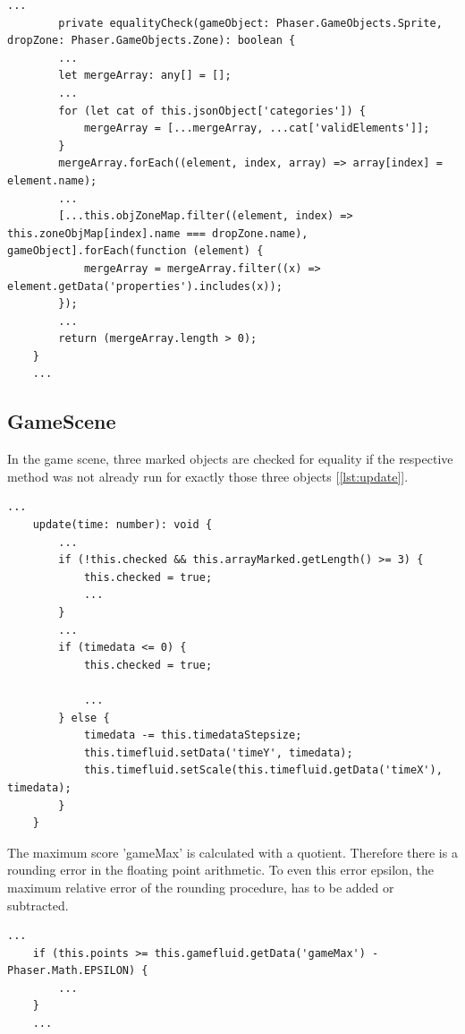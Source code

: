 \begin{lstlisting}[style=TypeScript, caption={equalityCheck (restrictedSortingScene.ts)}, label={lst:equalitycheckres}]
    ...
        private equalityCheck(gameObject: Phaser.GameObjects.Sprite, dropZone: Phaser.GameObjects.Zone): boolean {
        ...
        let mergeArray: any[] = [];
        ...
        for (let cat of this.jsonObject['categories']) {
            mergeArray = [...mergeArray, ...cat['validElements']];
        }
        mergeArray.forEach((element, index, array) => array[index] = element.name);
        ...
        [...this.objZoneMap.filter((element, index) => this.zoneObjMap[index].name === dropZone.name), gameObject].forEach(function (element) {
            mergeArray = mergeArray.filter((x) => element.getData('properties').includes(x));
        });
        ...
        return (mergeArray.length > 0);
    }
    ...
\end{lstlisting}

\subsection{GameScene}\label{subsec:gamescene}
In the game scene, three marked objects are checked for equality
if the respective method was not already run for exactly those three objects [\ref{lst:update}].

\begin{lstlisting}[style=TypeScript, caption={update (gameScene.ts)}, label={lst:update}]
    ...
    update(time: number): void {
        ...
        if (!this.checked && this.arrayMarked.getLength() >= 3) {
            this.checked = true;
            ...
        }
        ...
        if (timedata <= 0) {
            this.checked = true;

            ...
        } else {
            timedata -= this.timedataStepsize;
            this.timefluid.setData('timeY', timedata);
            this.timefluid.setScale(this.timefluid.getData('timeX'), timedata);
        }
    }
\end{lstlisting}

The maximum score 'gameMax' is calculated with a quotient.
Therefore there is a rounding error in the floating point arithmetic.
To even this error epsilon, the maximum relative error of the rounding procedure, has to be added or subtracted.

\begin{lstlisting}[style=TypeScript, caption={updateProgressbar (gameScene.ts)}]
    ...
    if (this.points >= this.gamefluid.getData('gameMax') - Phaser.Math.EPSILON) {
        ...
    }
    ...
\end{lstlisting}

